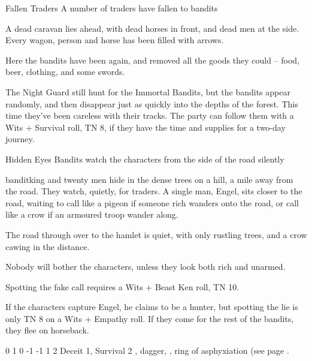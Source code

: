\begin{multicols}{2}
{Fallen Traders}%
{A number of traders have fallen to bandits}%

\begin{boxtext}

	A dead caravan lies ahead, with dead horses in front, and dead men at the side.  Every wagon, person and horse has been filled with arrows.

\end{boxtext}

Here the bandits have been again, and removed all the goods they could -- food, beer, clothing, and some swords.

The Night Guard still hunt for the Immortal Bandits, but the bandits appear randomly, and then disappear just as quickly into the depths of the forest.
This time they've been careless with their tracks.
The party can follow them with a Wits + Survival roll, TN 8, if they have the time and supplies for a two-day journey.

{Hidden Eyes}%
{Bandits watch the characters from the side of the road silently}%

\gls{banditking} and twenty men hide in the dense trees on a hill, a mile away from the road.
They watch, quietly, for traders.
A single man, Engel, sits closer to the road, waiting to call like a pigeon if someone rich wanders onto the road, or call like a crow if an armoured troop wander along.

\begin{boxtext}

	The road through over to the hamlet is quiet, with only rustling trees, and a crow cawing in the distance.

\end{boxtext}

Nobody will bother the characters, unless they look both rich and unarmed.

Spotting the fake call requires a Wits + Beast Ken roll, TN 10.

If the characters capture Engel, he claims to be a hunter, but spotting the lie is only TN 8 on a Wits + Empathy roll.
If they come for the rest of the bandits, they flee on horseback.


{0}%
{1}%
{{0}%
{-1}%
{-1}}%
{1}%
{2}%
{Deceit 1, Survival 2}%
{\shortsword, dagger, \partialleather, ring of asphyxiation (see page \pageref{ring_asphyxiation}.}%
{}


\end{multicols}
